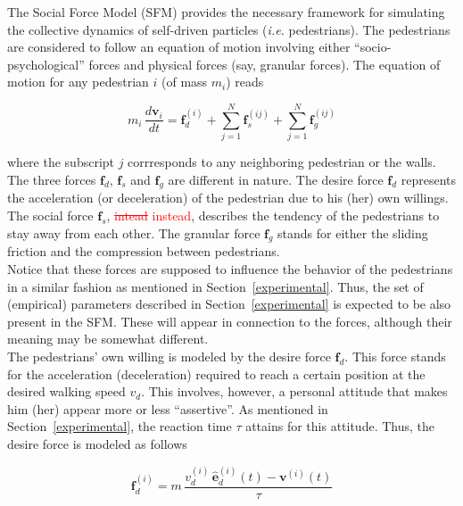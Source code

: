 \documentclass[preprint,12pt]{elsarticle}
\begin{document}
The Social Force Model (SFM) provides the necessary framework for simulating 
the collective dynamics of self-driven particles (\textit{i.e.} pedestrians). 
The pedestrians are considered to follow an equation of motion involving 
either ``socio-psychological'' forces and physical forces (say, granular 
forces). The equation of motion for any pedestrian $i$ (of mass $m_i$) reads

\begin{equation}
 m_i\,\displaystyle\frac{d\mathbf{v}_i}{dt}=\mathbf{f}_d^{(i)}+
 \displaystyle\sum_{j=1}^N\mathbf{f}_s^{(ij)}+
 \displaystyle\sum_{j=1}^N\mathbf{f}_g^{(ij)}\label{eqn_motion}
\end{equation}

\noindent where the subscript $j$ corrresponds to any neighboring pedestrian or 
the walls. The three forces $\mathbf{f}_d$, $\mathbf{f}_s$ and $\mathbf{f}_g$ 
are different in nature. The desire force $\mathbf{f}_d$ represents the 
acceleration (or deceleration) of the pedestrian due to his (her) own willings. 
The social force $\mathbf{f}_s$, \textcolor{red}{\sout{intead} instead}, describes the tendency of the 
pedestrians to stay away from each other. The granular force $\mathbf{f}_g$ 
stands for either the sliding friction and the compression between 
pedestrians. \\

Notice that these forces are supposed to influence the behavior of the 
pedestrians in a similar fashion as mentioned in Section~\ref{experimental}. 
Thus, the set of (empirical) parameters described in Section~\ref{experimental} 
is expected to be also present in the SFM. These will appear in connection to 
the forces, although their meaning may be somewhat different. \\   

The pedestrians' own willing is modeled by the desire force $\mathbf{f}_d$. 
This force stands for the acceleration (deceleration) required to reach a 
certain position at the desired walking speed $v_d$. This involves, however, a 
personal attitude that makes him (her) appear more or less ``assertive''. As 
mentioned in Section~\ref{experimental}, the reaction time $\tau$  attains for 
this attitude. Thus, the desire force is modeled as follows

\begin{equation}
\mathbf{f}_d^{(i)}=m\,\displaystyle\frac{v_d^{(i)}\,
\hat{\mathbf{e}}_d^{(i)}(t)-
 \mathbf{v}^{(i)}(t)}{\tau}
\end{equation}
\end{document}
